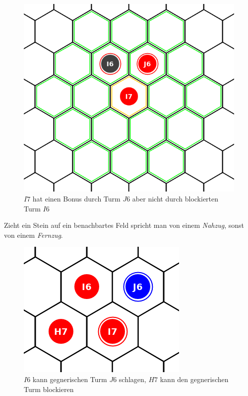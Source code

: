 \begin{figure}[ht]
\begin{center}
\includegraphics[scale=0.25]{graphic/range-blockedbonus.png}
\end{center}
\caption*{$I7$ hat einen Bonus durch Turm $J6$ aber nicht durch blockierten Turm $I6$}
\end{figure}

Zieht ein Stein auf ein benachbartes Feld spricht man von einem \emph{Nahzug}, sonst von einem \emph{Fernzug}.

\begin{figure}[ht]
\begin{center}
\includegraphics[scale=0.25]{graphic/token-kick-block-tower.png}
\end{center}
\caption*{$I6$ kann gegnerischen Turm $J6$ schlagen, $H7$ kann den gegnerischen Turm blockieren}
\end{figure}

